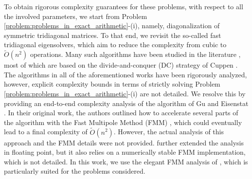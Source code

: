\documentclass{article}
\begin{document}
    To obtain rigorous complexity guarantees for these problems, with respect to all the involved parameters, we start from Problem \ref{problem:problems_in_exact_arithmetic}-(i), namely, diagonalization of symmetric tridiagonal matrices. To that end, we revisit the so-called fast tridiagonal eigensolvers, which aim to reduce the complexity from cubic to $\widetilde O(n^2)$ operations. 
    Many such algorithms have been studied in the literature \cite{dongarra1987fully,dhillon1997new,bini1992practical,bini1991parallel,gill1990n,vogel2016superfast,ou2022superdc,stor2015accurate,barlow1993error}, most of which are based on the divide-and-conquer (DC) strategy of Cuppen \cite{cuppen1980divide}. 
    The algorithms in all of the aforementioned works have been rigorously analyzed, however, explicit complexity bounds in terms of strictly solving Problem \ref{problem:problems_in_exact_arithmetic}-(i) are not detailed. 
    We resolve this by providing an end-to-end complexity analysis of the algorithm of Gu and Eisenstat \cite{gu1995divide}. In their original work, the authors outlined how to accelerate several parts of the algorithm with the Fast Multipole Method (FMM) \cite{rokhlin1985rapid}, which could eventually lead to a final complexity of $\widetilde O(n^2)$. However, the actual analysis of this approach and the FMM details were not provided. 
    \cite{musco2018stability} further extended the analysis in floating point, but it also relies on a numerically stable FMM implementation, which is not detailed. In this work, we use the elegant FMM analysis of \cite{gu1993stable,livne2002n,cai2020stable}, which is particularly suited for the problems considered.
\end{document}
